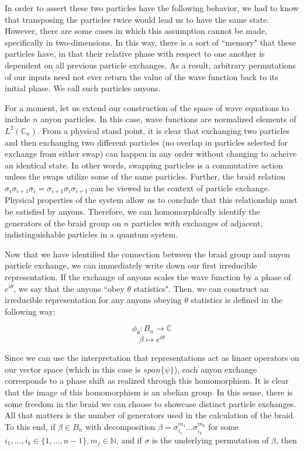 \documentclass[10pt]{ucthesis}
\newcommand{\N}{\mathbb{N}}
\newcommand{\C}{\mathbb{C}}
\begin{document}
In order to assert these two particles have the following behavior, we had to know that transposing the particles twice would lead us to have the same state. However, there are some cases in which this assumption cannot be made, specifically in two-dimensions. In this way, there is a sort of ``memory" that these particles have, in that their relative phase with respect to one another is dependent on all previous particle exchanges. As a result, arbitrary permutations of our inputs need not ever return the value of the wave function back to its initial phase. We call such particles anyons.

For a moment, let us extend our construction of the space of wave equations to include $n$ anyon particles. In this case, wave functions are normalized elements of $L^2(\C_n)$. From a physical stand point, it is clear that exchanging two particles and then exchanging two different particles (no overlap in particles selected for exchange from either swap) can happen in any order without changing to acheive an identical state. In other words, swapping particles is a commutative action unless the swaps utilize some of the same particles. Further, the braid relation $\sigma_i\sigma_{i+1}\sigma_i =\sigma_{i+1}\sigma_i\sigma_{i+1}$ can be viewed in the context of particle exchange. Physical properties of the system allow us to conclude that this relationship must be satisfied by anyons. Therefore, we can homomorphically identify the generators of the braid group on $n$ particles with exchanges of adjacent, indistinguishable particles in a quantum system.

Now that we have identified the connection between the braid group and anyon particle exchange, we can immediately write down our first irreducible representation. If the exchange of anyons scales the wave function by a phase of $e^{i\theta}$, we say that the anyons ``obey $\theta$ statistics". Then, we can construct an irreducible representation for any anyons obeying $\theta$ statistics is defined in the following way:

$$\phi_\theta:B_n\rightarrow \C$$
$$\beta\mapsto e^{i\theta}$$

Since we can use the interpretation that representations act as linaer operators on our vector space (which in this case is $span\{\psi\}$), each anyon exchange corresponds to a phase shift as realized through this homomorphism. It is clear that the image of this homomorphism is an abelian group. In this sense, there is some freedom in the braid we can choose to showcase distinct particle exchanges. All that matters is the number of generators used in the calculation of the braid. To this end, if $\beta\in B_n$ with decomposition $\beta = \sigma^{m_1}_{i_1}\hdots\sigma^{m_k}_{i_k}$ for some $i_1,\hdots,i_k\in\{1,\hdots,n-1\},m_j\in\N$, and if $\sigma$ is the underlying permutation of $\beta$, then
\end{document}
